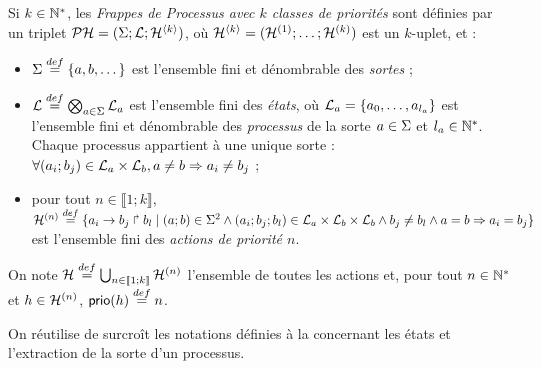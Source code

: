 \begin{definition}
  Si $k \in \mathbb{N}^*$, les \emph{Frappes de Processus avec $k$ classes de priorités} sont définies
  par un triplet $\mathcal{PH} = (\Sigma; \mathcal{L}; \mathcal{H}^{\langle k \rangle})$,
  où $\mathcal{H}^{\langle k \rangle} = (\mathcal{H}^{(1)}; \dots; \mathcal{H}^{(k)})$ est un $k$-uplet, et :
  \begin{itemize}
    \item $\Sigma \stackrel{def}= \{a, b, \dots\}$ est l'ensemble fini et dénombrable des \emph{sortes} ;
    \item $\mathcal{L} \stackrel{def}= \bigotimes_{a \in \Sigma} \mathcal{L}_a$ est l'ensemble fini des \emph{états},
      où $\mathcal{L}_a = \{a_0, \ldots, a_{l_a}\}$ est l'ensemble fini et dénombrable
      des \emph{processus} de la sorte $a \in \Sigma$ et $l_a \in \mathbb{N}^*$.
      Chaque processus appartient à une unique sorte :
      $\forall (a_i; b_j) \in \mathcal{L}_a \times \mathcal{L}_b, a \neq b \Rightarrow a_i \neq b_j$ ;
    \item pour tout $n \in \llbracket 1; k \rrbracket$,
      $\mathcal{H}^{(n)} \stackrel{def}= \{a_i\rightarrow b_j\Rsh b_l \mid (a; b) \in \Sigma^2 \wedge
      (a_i; b_j; b_l) \in \mathcal{L}_a \times \mathcal{L}_b \times \mathcal{L}_b \wedge
      b_j \neq b_l \wedge a = b \Rightarrow a_i = b_j \}$ est l'ensemble fini
      des \emph{actions de priorité $n$}.
  \end{itemize}
  On note $\mathcal{H} \stackrel{def}= \bigcup_{n \in \llbracket 1; k \rrbracket} \mathcal{H}^{(n)}$ l'ensemble de toutes les actions
  et, pour tout $n \in \mathbb{N}^*$ et $h \in \mathcal{H}^{(n)}$, $\mathsf{prio}(h) \stackrel{def}= n$.
\end{definition}
%
\noindent
On réutilise de surcroît les notations définies à la  concernant les états et
l'extraction de la sorte d'un processus.



